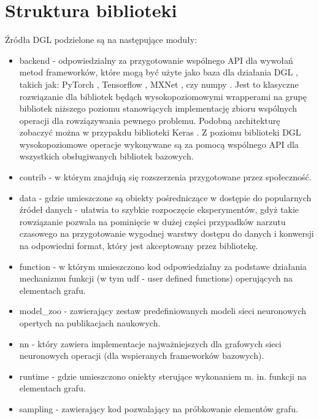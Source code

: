 \documentclass{article}
\begin{document}
\section{Struktura biblioteki}
\label{sec:dgl_structure}
Źródła DGL \cite{dgl_sources} podzielone są na następujące moduły:
\begin{itemize}
  \item backend - odpowiedzialny za przygotowanie wspólnego API dla wywołań metod frameworków, które mogą być użyte jako baza dla działania DGL \cite{dgl}, takich jak: PyTorch \cite{torch}, Tensorflow \cite{tf}, MXNet \cite{mxnet}, czy numpy \cite{np}. Jest to klasyczne rozwiązanie dla bibliotek będąch wysokopoziomowymi wrapperami na grupę bibliotek niższego poziomu stanowiących implementację zbioru wspólnych operacji dla rowziązywania pewnego problemu. Podobną architekturę zobaczyć można w przypakdu biblioteki Keras \cite{keras}. Z poziomu biblioteki DGL \cite{dgl} wysokopoziomowe operacje wykonywane są za pomocą wspólnego API dla wszystkich obsługiwanych bibliotek bazowych.   
  \item contrib - w którym znajdują się rozszerzenia przygotowane przez społeczność.
  \item data - gdzie umieszczone są obiekty pośredniczące w dostępie do popularnych źródeł danych - ułatwia to szybkie rozpoczęcie eksperymentów, gdyż takie rowziązanie pozwala na pominięcie w dużej części przypadków narzutu czasowego na przygotowanie wygodnej warstwy dostępu do danych i konwersji na odpowiedni format, który jest akceptowany przez bibliotekę.
  \item function - w którym umieszczono kod odpowiedzialny za podstawe działania mechanizmu funkcji (w tym udf - user defined functions) operujących na elementach grafu.
  \item model\_zoo - zawierający zestaw predefiniowanych modeli sieci neuronowych opertych na publikacjach naukowych.
  \item nn - który zawiera implementacje najważniejszych dla grafowych sieci neuronowych operacji (dla wspieranych frameworków bazowych).
  \item runtime - gdzie umieszczono oniekty sterujące wykonaniem m. in. funkcji na elementach grafu.
  \item sampling - zawierający kod pozwalający na próbkowanie elementów grafu.
\end{itemize}
  
 \paragraph{}
\end{document}

